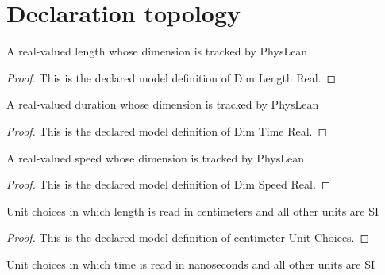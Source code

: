 \section{Declaration topology}
\begin{definition}
  \label{def:physics:phyx-mini-0023:phyxminiproblems-problemphyxmini0023-dimlengthreal}
  A real-valued length whose dimension is tracked by PhysLean
\end{definition}
\begin{proof}
  This is the declared model definition of Dim Length Real.
\end{proof}
\begin{definition}
  \label{def:physics:phyx-mini-0023:phyxminiproblems-problemphyxmini0023-dimtimereal}
  A real-valued duration whose dimension is tracked by PhysLean
\end{definition}
\begin{proof}
  This is the declared model definition of Dim Time Real.
\end{proof}
\begin{definition}
  \label{def:physics:phyx-mini-0023:phyxminiproblems-problemphyxmini0023-dimspeedreal}
  A real-valued speed whose dimension is tracked by PhysLean
\end{definition}
\begin{proof}
  This is the declared model definition of Dim Speed Real.
\end{proof}
\begin{definition}
  \label{def:physics:phyx-mini-0023:phyxminiproblems-problemphyxmini0023-centimeterunitchoices}
  Unit choices in which length is read in centimeters and all other units are SI
\end{definition}
\begin{proof}
  This is the declared model definition of centimeter Unit Choices.
\end{proof}
\begin{definition}
  \label{def:physics:phyx-mini-0023:phyxminiproblems-problemphyxmini0023-nanosecondunitchoices}
  Unit choices in which time is read in nanoseconds and all other units are SI
\end{definition}
